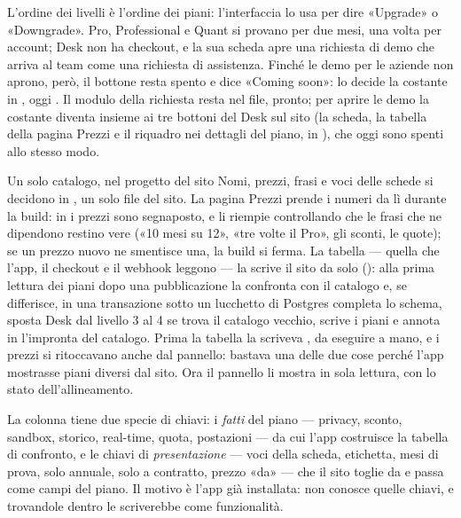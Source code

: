 \noindent
L'ordine dei livelli è l'ordine dei piani: l'interfaccia lo usa per dire
«Upgrade» o «Downgrade». Pro, Professional e Quant si provano per due mesi,
una volta per account; Desk non ha checkout, e la sua scheda apre una
richiesta di demo che arriva al team come una richiesta di assistenza.
Finché le demo per le aziende non aprono, però, il bottone resta spento e
dice «Coming soon»: lo decide la costante  in
, oggi . Il modulo
della richiesta resta nel file, pronto; per aprire le demo la costante
diventa  insieme ai tre bottoni del Desk sul sito (la scheda, la
tabella della pagina Prezzi e il riquadro nei dettagli del piano, in
), che oggi sono spenti allo stesso modo.

\begin{nota}{Un solo catalogo, nel progetto del sito}
Nomi, prezzi, frasi e voci delle schede si decidono in
\mbox{}, un solo file del sito. La pagina Prezzi
prende i numeri da lì durante la build: in  i prezzi sono
segnaposto, e \mbox{} li riempie controllando che
le frasi che ne dipendono restino vere («10 mesi su 12», «tre volte il Pro»,
gli sconti, le quote); se un prezzo nuovo ne smentisce una, la build si
ferma. La tabella  --- quella che l'app, il checkout e
il webhook leggono --- la scrive il sito da solo
(\mbox{}): alla prima lettura dei piani dopo
una pubblicazione la confronta con il catalogo e, se differisce, in una
transazione sotto un lucchetto di Postgres completa lo schema, sposta Desk
dal livello 3 al 4 se trova il catalogo vecchio, scrive i piani e annota in
 l'impronta del catalogo. Prima la tabella la scriveva
, da eseguire a mano, e i prezzi si
ritoccavano anche dal pannello: bastava una delle due cose perché l'app
mostrasse piani diversi dal sito. Ora il pannello li mostra in sola lettura,
con lo stato dell'allineamento.

La colonna  tiene due specie di chiavi: i \emph{fatti} del
piano --- privacy, sconto, sandbox, storico, real-time, quota, postazioni ---
da cui l'app costruisce la tabella di confronto, e le chiavi di
\emph{presentazione} --- voci della scheda, etichetta, mesi di prova, solo
annuale, solo a contratto, prezzo «da» --- che il sito toglie da
 e passa come campi del piano. Il motivo è l'app già
installata: non conosce quelle chiavi, e trovandole dentro  le
scriverebbe come funzionalità.
\end{nota}

